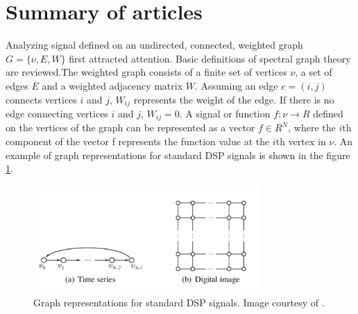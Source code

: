 \documentclass[conference]{IEEEtran}
\begin{document}
\section{Summary of articles}
Analyzing signal defined on an undirected, connected, weighted graph $G=\{\nu, E, W\}$ first attracted attention. Basic definitions of spectral graph theory are reviewed.The weighted graph consists of a finite set of vertices $\nu$, a set of edges $E$ and a weighted adjacency matrix $W$. Assuming an edge $e=(i,j)$ connects vertices $i$ and $j$, $W_{ij}$ represents the weight of the edge. If there is no edge connecting vertices $i$ and $j$, $W_{ij}=0$. A signal or function $f:\nu\to R$ defined on the vertices of the graph can be represented as a vector $f\in R^N$, where the $i$th component of the vector f represents the function value at the $i$th vertex in $\nu$. An example of graph representations for standard DSP signals is shown in the figure \ref{5}.
\begin{figure}[htbp]
\centerline{\includegraphics[width=3.4in]{5.png}}
\caption{Graph representations for standard DSP signals. Image courtesy of \cite{sandryhaila2013discrete3}.}
\label{5}
\end{figure}
\end{document}
